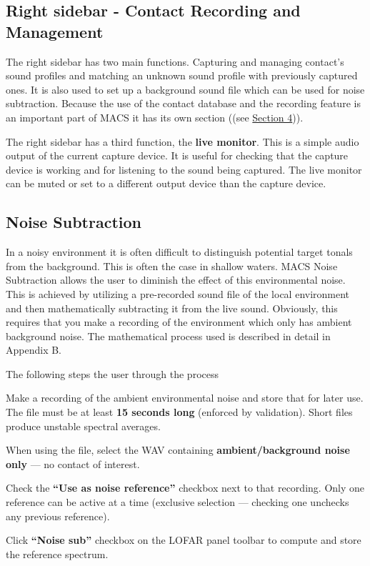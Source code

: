 \subsection{Right sidebar - Contact Recording and Management}

The right sidebar has two main functions. Capturing and managing contact's sound profiles and matching an unknown sound profile with previously captured ones. It is also used to set up a background sound file which can be used for noise subtraction. Because the use of the contact database and the recording feature is an important part of MACS it has its own section ((see \hyperref[sec:Database]{Section 4})).

The right sidebar has a third function, the \textbf{live monitor}. This is a simple audio output of the current capture device. It is useful for checking that the capture device is working and for listening to the sound being captured. The live monitor can be muted or set to a different output device than the capture device.

\subsection{Noise Subtraction}

In a noisy environment it is often difficult to distinguish potential target tonals from the background. This is often the case in shallow waters. MACS Noise Subtraction allows the user to diminish the effect of this environmental noise. This is achieved by utilizing a pre-recorded sound file of the local environment and then mathematically subtracting it from the live sound. Obviously, this requires that you make a recording of the environment which only has ambient background noise. The mathematical process used is described in detail in Appendix B.

The following steps the user through the process

\begin{compactenum}
    \item Make a recording of the ambient environmental noise and store that for later use. The file must be at least \textbf{15 seconds long} (enforced by validation). Short files produce unstable spectral averages.
    \item When using the file, select the WAV containing \textbf{ambient/background noise only} --- no contact of interest.
    \item Check the \textbf{\enquote{Use as noise reference}} checkbox next to that recording. Only one reference can be active at a time (exclusive selection --- checking one unchecks any previous reference).
    \item Click \textbf{\enquote{Noise sub}} checkbox on the LOFAR panel toolbar to compute and store the reference spectrum.
\end{compactenum}

